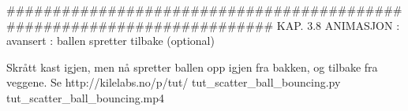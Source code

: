 ######################################################################## 
KAP. 3.8  ANIMASJON : avansert : ballen spretter tilbake  (optional)

Skrått kast igjen, men nå spretter ballen opp igjen fra bakken,
og tilbake fra veggene.
Se http://kilelabs.no/p/tut/
tut_scatter_ball_bouncing.py 
tut_scatter_ball_bouncing.mp4


